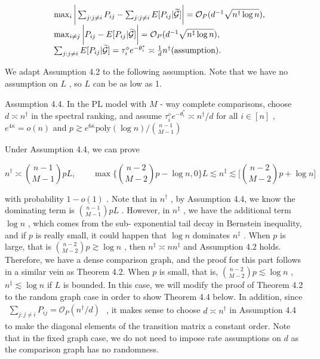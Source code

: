 \[
\begin{array}{r l} & {\max_{i}\bigg|\sum_{j:j\neq i}P_{i j} - \sum_{j:j\neq i}E[P_{i j}|\widetilde{\mathcal{G}} ]\bigg| = \mathcal{O}_{P}(d^{-1}\sqrt{n^{\dagger}\log n}),}\\ & {\max_{i\neq j}\bigg|P_{i j} - E[P_{i j}|\widetilde{\mathcal{G}} ]\bigg| = \mathcal{O}_{P}(d^{-1}\sqrt{n^{\ddagger}\log n}),}\\ & {\sum_{j:j\neq i}E[P_{i j}|\widetilde{\mathcal{G}} ] = \tau_{i}^{\diamond}e^{-\theta_{i}^{*}}\asymp \frac{1}{d} n^{\dagger} \mathrm{(assumption)}.} \end{array}
\]

We adapt Assumption 4.2 to the following assumption. Note that we have
no assumption on \(L\) , so \(L\) can be as low as 1.

Assumption 4.4. In the PL model with \(M\) - way complete comparisons,
choose \(d\asymp n^{\dagger}\) in the spectral ranking, and assume
\(\tau_{i}^{\diamond}e^{- \theta_{i}^{*}}\asymp n^{\dagger} / d\) for
all \(i\in [n]\) , \(e^{4\bar{\kappa}} = o(n)\) and
\(p\gtrsim e^{6\bar{\kappa}}\mathrm{poly}(\log n) / \binom{n- 1}{M- 1}\)

Under Assumption 4.4, we can prove

\[
n^{\dagger}\asymp \binom{n-1}{M-1}p L,\qquad\max \Big\{\binom{n-2}{M-2}p-\log n,0\Big\}L\lesssim n^{\ddagger}\lesssim\Big[\binom{n-2}{M-2}p+\log n\Big]
\]

with probability \(1 - o(1)\) . Note that in \(n^{\dagger}\) , by
Assumption 4.4, we know the dominating term is
\(\textstyle{\binom{n- 1}{M- 1}}p L\) . However, in \(n^{\ddagger}\) ,
we have the additional term \(\log n\) , which comes from the sub-
exponential tail decay in Bernstein inequality, and if \(p\) is really
small, it could happen that \(\log n\) dominates \(n^{\ddagger}\) . When
\(p\) is large, that is \(\textstyle{\binom{n- 2}{M- 2}}p\gtrsim\log n\)
, then \(n^{\ddagger}\asymp n n^{\ddagger}\) and Assumption 4.2 holds.
Therefore, we have a dense comparison graph, and the proof for this part
follows in a similar vein as Theorem 4.2. When \(p\) is small, that is,
\(\textstyle{\binom{n- 2}{M- 2}}p\lesssim\log n\) ,
\(n^{\ddagger}\lesssim\log n\) if \(L\) is bounded. In this case, we
will modify the proof of Theorem 4.2 to the random graph case in order
to show Theorem 4.4 below. In addition, since
\(\begin{array}{r}{\sum_{j:j\neq i}P_{i j} = \mathcal{O}_{P}(n^{\dagger} / d)} \end{array}\)
, it makes sense to choose \(d\asymp n^{\dagger}\) in Assumption 4.4 to
make the diagonal elements of the transition matrix a constant order.
Note that in the fixed graph case, we do not need to impose rate
assumptions on \(d\) as the comparison graph has no randomness.

